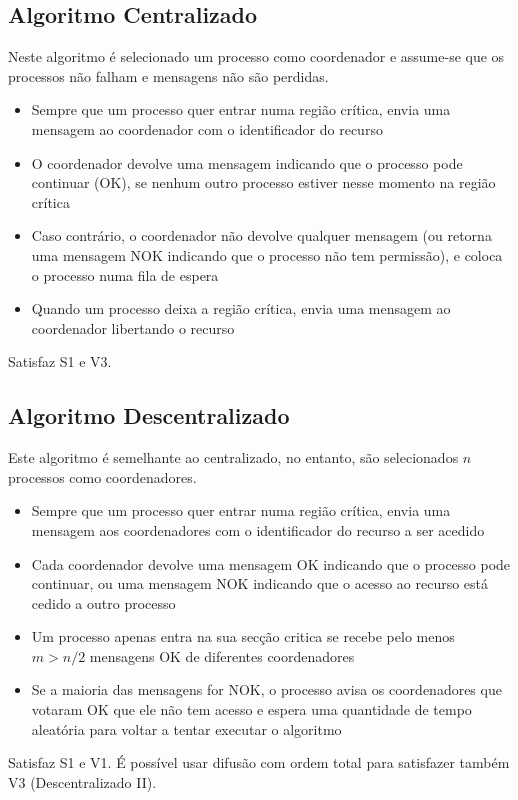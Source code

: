 \documentclass[10pt,a4paper]{report}
\begin{document}
\subsection{Algoritmo Centralizado}
Neste algoritmo é selecionado um processo como coordenador e assume-se que os processos não falham e mensagens não são perdidas.
\begin{itemize}
\item Sempre que um processo quer entrar numa região crítica, envia uma mensagem ao coordenador com o identificador do recurso
\item O coordenador devolve uma mensagem indicando que o processo pode continuar (OK), se nenhum outro processo estiver nesse momento na região crítica
\item Caso contrário, o coordenador não devolve qualquer mensagem (ou retorna uma mensagem NOK indicando que o processo não tem permissão), e coloca o processo numa fila de espera
\item Quando um processo deixa a região crítica, envia uma mensagem ao coordenador libertando o recurso
\end{itemize}
Satisfaz S1 e V3.
\subsection{Algoritmo Descentralizado}
Este algoritmo é semelhante ao centralizado, no entanto, são selecionados $n$ processos como coordenadores.
\begin{itemize}
\item Sempre que um processo quer entrar numa região crítica, envia uma mensagem aos coordenadores com o identificador do recurso a ser acedido
\item Cada coordenador devolve uma mensagem OK indicando que o processo pode continuar, ou uma mensagem NOK indicando que o acesso ao recurso está cedido a outro processo
\item Um processo apenas entra na sua secção critica se recebe pelo menos $m > n/2$ mensagens OK de diferentes coordenadores
\item Se a maioria das mensagens for NOK, o processo avisa os coordenadores que votaram OK que ele não tem acesso e espera uma quantidade de tempo aleatória para voltar a tentar executar o algoritmo
\end{itemize}
Satisfaz S1 e V1. É possível usar difusão com ordem total para satisfazer também V3 (Descentralizado II).
\end{document}
